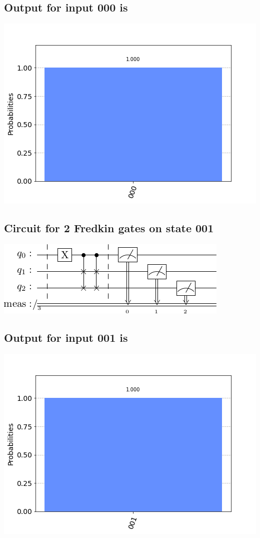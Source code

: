 \documentclass[a4paper]{article}
\begin{document}
\begin{answer}[Question 1 a]
        \subsection*{Output for input 000 is}
        \includegraphics[scale = 0.5]{1a000-out.png}
        \subsection*{Circuit for 2 Fredkin gates on state 001}
        \includegraphics[scale = 0.5]{1a001.png}
        \subsection*{Output for input 001 is}
        \includegraphics[scale = 0.5]{1a001-out.png}

\end{answer}
\end{document}

